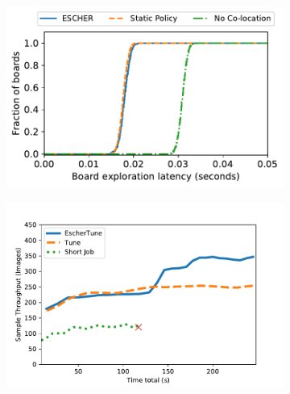 \begin{figure}[t]
  \begin{subfigure}[b]{0.46\textwidth}
    \centering
    \includegraphics[width=\textwidth]{escher/plots/results_e2e_alphago_latencycdf_16node.pdf}
    \caption{}
    \label{fig:alphazerolatencycdf}
  \end{subfigure}
  \begin{subfigure}[b]{0.46\textwidth}
  \centering
  \includegraphics[width=\textwidth,trim=0cm 0cm 1.5cm 0cm, clip]{escher/plots/result_migrationthroughput.pdf}
  \caption{}
  \label{fig:tune-results}
  \end{subfigure}

\end{figure}
